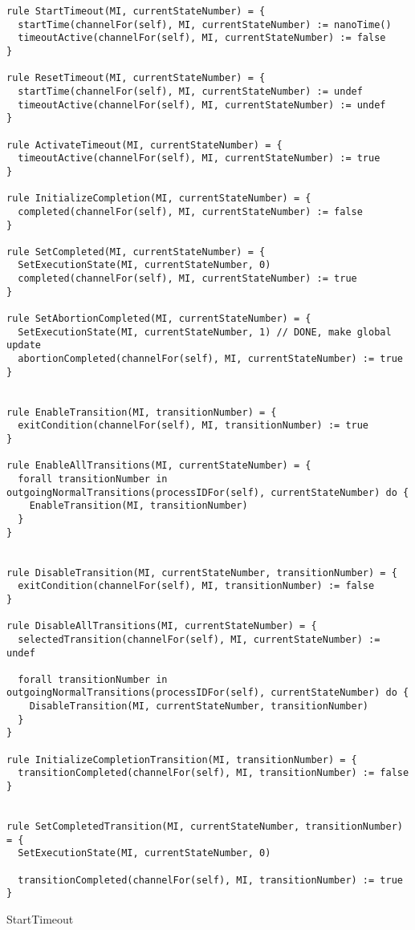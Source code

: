 \begin{listing}[H]
\begin{verbatim}
rule StartTimeout(MI, currentStateNumber) = {
  startTime(channelFor(self), MI, currentStateNumber) := nanoTime()
  timeoutActive(channelFor(self), MI, currentStateNumber) := false
}

rule ResetTimeout(MI, currentStateNumber) = {
  startTime(channelFor(self), MI, currentStateNumber) := undef
  timeoutActive(channelFor(self), MI, currentStateNumber) := undef
}

rule ActivateTimeout(MI, currentStateNumber) = {
  timeoutActive(channelFor(self), MI, currentStateNumber) := true
}

rule InitializeCompletion(MI, currentStateNumber) = {
  completed(channelFor(self), MI, currentStateNumber) := false
}

rule SetCompleted(MI, currentStateNumber) = {
  SetExecutionState(MI, currentStateNumber, 0)
  completed(channelFor(self), MI, currentStateNumber) := true
}

rule SetAbortionCompleted(MI, currentStateNumber) = {
  SetExecutionState(MI, currentStateNumber, 1) // DONE, make global update
  abortionCompleted(channelFor(self), MI, currentStateNumber) := true
}


rule EnableTransition(MI, transitionNumber) = {
  exitCondition(channelFor(self), MI, transitionNumber) := true
}

rule EnableAllTransitions(MI, currentStateNumber) = {
  forall transitionNumber in outgoingNormalTransitions(processIDFor(self), currentStateNumber) do {
    EnableTransition(MI, transitionNumber)
  }
}


rule DisableTransition(MI, currentStateNumber, transitionNumber) = {
  exitCondition(channelFor(self), MI, transitionNumber) := false
}

rule DisableAllTransitions(MI, currentStateNumber) = {
  selectedTransition(channelFor(self), MI, currentStateNumber) := undef

  forall transitionNumber in outgoingNormalTransitions(processIDFor(self), currentStateNumber) do {
    DisableTransition(MI, currentStateNumber, transitionNumber)
  }
}

rule InitializeCompletionTransition(MI, transitionNumber) = {
  transitionCompleted(channelFor(self), MI, transitionNumber) := false
}


rule SetCompletedTransition(MI, currentStateNumber, transitionNumber) = {
  SetExecutionState(MI, currentStateNumber, 0)

  transitionCompleted(channelFor(self), MI, transitionNumber) := true
}
\end{verbatim}
\caption{StartTimeout}
\label{lst:asm:StartTimeout}
\end{listing}





